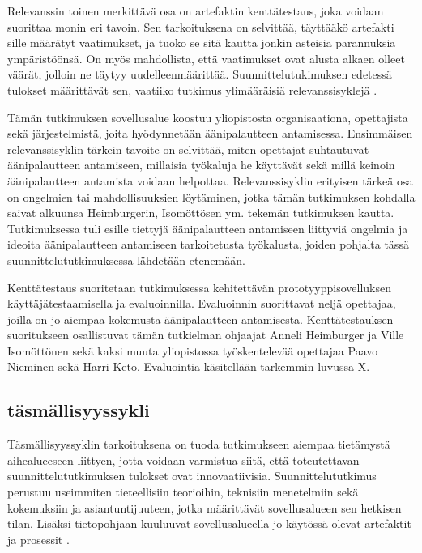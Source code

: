 \documentclass[utf8]{gradu3}
\begin{document}
Relevanssin toinen merkittävä osa on artefaktin kenttätestaus, joka voidaan suorittaa monin eri tavoin. Sen tarkoituksena on selvittää, täyttääkö artefakti sille määrätyt vaatimukset, ja tuoko se sitä kautta jonkin asteisia parannuksia ympäristöönsä. On myös mahdollista, että vaatimukset ovat alusta alkaen olleet väärät, jolloin ne täytyy uudelleenmäärittää. Suunnittelutukimuksen edetessä tulokset määrittävät sen, vaatiiko tutkimus ylimääräisiä relevanssisyklejä \parencite[][]{cycles}.

Tämän tutkimuksen sovellusalue koostuu yliopistosta organisaationa, opettajista sekä järjestelmistä, joita hyödynnetään äänipalautteen antamisessa. Ensimmäisen relevanssisyklin tärkein tavoite on selvittää, miten opettajat suhtautuvat äänipalautteen antamiseen, millaisia työkaluja he käyttävät sekä millä keinoin äänipalautteen antamista voidaan helpottaa. Relevanssisyklin erityisen tärkeä osa on ongelmien tai mahdollisuuksien löytäminen, jotka tämän tutkimuksen kohdalla saivat alkuunsa Heimburgerin, Isomöttösen ym. \parencite[][]{academics} tekemän tutkimuksen kautta. Tutkimuksessa tuli esille tiettyjä äänipalautteen antamiseen liittyviä ongelmia ja ideoita äänipalautteen antamiseen tarkoitetusta työkalusta, joiden pohjalta tässä suunnittelututkimuksessa lähdetään etenemään.

Kenttätestaus suoritetaan tutkimuksessa kehitettävän prototyyppisovelluksen käyttäjätestaamisella ja evaluoinnilla. Evaluoinnin suorittavat neljä opettajaa, joilla on jo aiempaa kokemusta äänipalautteen antamisesta. Kenttätestauksen suoritukseen osallistuvat tämän tutkielman ohjaajat Anneli Heimburger ja Ville Isomöttönen sekä kaksi muuta yliopistossa työskentelevää opettajaa Paavo Nieminen sekä Harri Keto. Evaluointia käsitellään tarkemmin luvussa X. 

\subsection{täsmällisyyssykli}

Täsmällisyyssyklin tarkoituksena on tuoda tutkimukseen aiempaa tietämystä aihealueeseen liittyen, jotta voidaan varmistua siitä, että toteutettavan suunnittelututkimuksen tulokset ovat innovaatiivisia. Suunnittelututkimus perustuu useimmiten tieteellisiin teorioihin, teknisiin menetelmiin sekä kokemuksiin ja asiantuntijuuteen, jotka määrittävät sovellusalueen sen hetkisen tilan. Lisäksi tietopohjaan kuuluuvat sovellusalueella jo käytössä olevat artefaktit ja prosessit \parencite[][]{cycles}.
\end{document}
